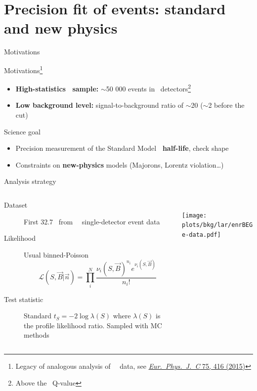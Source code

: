 \documentclass[10pt,aspectratio=169]{beamer}
\begin{document}
\section{Precision fit of \texorpdfstring{\nnbb}{2nubb} events: standard and new physics}
\begin{frame}{Motivations}
  \begin{exampleblock}{Motivations\footnote{Legacy of analogous analysis of \gerda\ \phaseone\
    data, see \href{https://doi.org/10.1140/epjc/s10052-015-3627-y}{\emph{Eur.~Phys.~J.~C} 75, 416 (2015)}}}
    \begin{itemize}
      \item \textbf{High-statistics \nnbb\ sample:} $\sim$50 000 events in \bege\ detectors\footnote{Above the \Arl\ Q-value}
      \item \textbf{Low background level:} signal-to-background ratio of $\sim$20 ($\sim$2 before the cut)
    \end{itemize}
  \end{exampleblock}

  \begin{alertblock}{Science goal}
    \begin{itemize}
      \item Precision measurement of the Standard Model \textbf{\nnbb\ half-life}, check shape
      \item Constraints on \textbf{new-physics} models (Majorons, Lorentz violation\ldots)
    \end{itemize}
  \end{alertblock}
\end{frame}
\begin{frame}{Analysis strategy}
  \begin{columns}
    \hspace{-1cm}
    \begin{column}{0.6\textwidth}
      \begin{description}
        \item[Dataset] First \alert{32.7~\kgyr} from \phasetwo\ \alert{\bege\
          single-detector} event data
        \item[Likelihood] Usual binned-Poisson
          \[
            \mathcal{L}(S, \vec{B} | \vec{n}) =
            \prod_i^{N} \frac{{\nu_i(S, \vec{B})}^{n_i} e^{\nu_i(S, \vec{B})}}{n_i!}
          \]
        \item[Test statistic] Standard \alert{$t_S = -2\log\lambda(S)$} where
          $\lambda(S)$ is the \alert{profile likelihood ratio}. Sampled with MC
          methods
      \end{description}
    \end{column}
    \hspace{-2cm}
    \begin{column}{0.4\textwidth}
      \vspace*{1cm} \\
      \texttt{[image: plots/bkg/lar/enrBEGe-data.pdf]}
    \end{column}
  \end{columns}
\end{frame}
\end{document}
